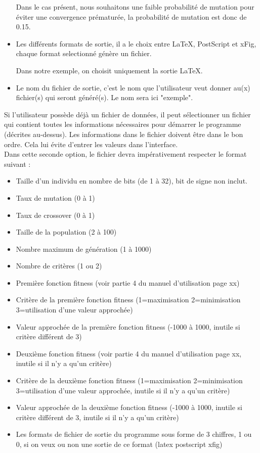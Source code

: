 \documentclass[a4paper,11pt]{article}
\begin{document}
\begin{itemize}
							Dans le cas présent, nous souhaitons une faible probabilité de mutation pour éviter une convergence prématurée, la probabilité de mutation est donc de 0.15.
					\item	Les différents formats de sortie, il a le choix entre LaTeX, PostScript et xFig, chaque format selectionné génère un fichier.

							Dans notre exemple, on choisit uniquement la sortie LaTeX.
					\item	Le nom du fichier de sortie, c'est le nom que l'utilisateur veut donner au(x) fichier(s) qui seront généré(s).
							Le nom sera ici "exemple".\\
					\end{itemize}
			Si l’utilisateur possède déjà un fichier de données, il peut  sélectionner un fichier qui contient toutes les informations nécessaires pour démarrer le programme (décrites au-dessus).
			Les informations dans le fichier doivent être dans le bon ordre.
			Cela lui évite d’entrer les valeurs dans l’interface.\\
			Dans cette seconde option, le fichier devra impérativement respecter le format suivant :
				\begin{itemize}
					\item Taille d'un individu en nombre de bits (de 1 à 32), bit de signe non inclut.
					\item Taux de mutation (0 à 1)
					\item Taux de crossover (0 à 1)
					\item Taille de la population (2 à 100)
					\item Nombre maximum de génération (1 à 1000)
					\item Nombre de critères (1 ou 2)
					\item Première fonction fitness (voir partie 4 du manuel d'utilisation page xx)
					\item Critère de la première fonction fitness (1=maximisation 2=minimisation 3=utilisation d'une valeur approchée)
					\item Valeur approchée de la première fonction fitness (-1000 à 1000, inutile si critère différent de 3)
					\item Deuxième fonction fitness (voir partie 4 du manuel d'utilisation page xx, inutile si il n'y a qu'un critère)
					\item Critère de la deuxième fonction fitness (1=maximisation 2=minimisation 3=utilisation d'une valeur approchée, inutile si il n'y a qu'un critère)
					\item Valeur approchée de la deuxième fonction fitness (-1000 à 1000, inutile si critère différent de 3, inutile si il n'y a qu'un critère)
					\item Les formats de fichier de sortie du programme sous forme de 3 chiffres, 1 ou 0, si on veux ou non une sortie de ce format (latex postscript xfig)
				\end{itemize}
\end{document}
